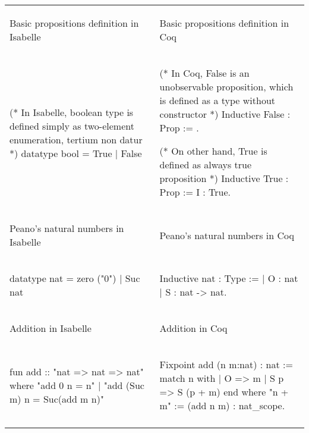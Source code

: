 \documentclass[article]{aaltoseries}
\begin{document}
\bgroup
\def\arraystretch{0}%
\begin{tabular}{p{.45\linewidth} p{.45\linewidth}}
\begin{center}Basic propositions definition in Isabelle\end{center}  &  \begin{center}Basic propositions definition in Coq\end{center} \\
\begin{isabelle}
    (* In Isabelle, boolean type is defined simply as two-element enumeration, tertium non datur *)
    datatype bool = True | False
\end{isabelle}
&
\begin{coq}
    (* In Coq, False is an unobservable proposition, which is defined as a type without constructor *)
    Inductive False : Prop := .
    
    (* On other hand, True is defined as always true proposition *)
    Inductive True : Prop := I : True.
\end{coq}
\\ \arrayrulecolor{gray}\hline

\begin{center}Peano's natural numbers in Isabelle\end{center}  &  \begin{center}Peano's natural numbers in Coq\end{center} \\
\begin{isabelle}
    datatype nat = 
    zero ("0")
    | Suc nat
\end{isabelle}
&
\begin{coq}
    Inductive nat : Type :=
    | O : nat
    | S : nat -> nat.
\end{coq}
\\ \arrayrulecolor{gray}\hline

\begin{center}Addition in Isabelle\end{center}  &  \begin{center}Addition in Coq\end{center} \\
\begin{isabelle}
    fun add :: "nat => nat => nat" where
    "add 0 n = n"
    | "add (Suc m) n = Suc(add m n)"
\end{isabelle}
&
\begin{coq}
    Fixpoint add (n m:nat) : nat :=
    match n with
    | O => m
    | S p => S (p + m)
    end
    where "n + m" := (add n m) : nat_scope.
\end{coq}
\\ \arrayrulecolor{gray}\hline


\end{tabular}
\end{document}
